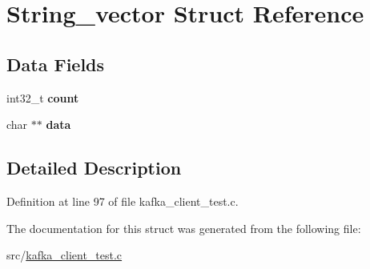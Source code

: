 \hypertarget{structString__vector}{\section{\-String\-\_\-vector \-Struct \-Reference}
\label{structString__vector}
}
\subsection*{\-Data \-Fields}
\begin{DoxyCompactItemize}
\item 
\hypertarget{structString__vector_aa3749113f2ee50991e0398e890ca05e0}{int32\-\_\-t {\bfseries count}}\label{structString__vector_aa3749113f2ee50991e0398e890ca05e0}

\item 
\hypertarget{structString__vector_ae65e2b4f4d044be7dfa6c6279df87c7e}{char $\ast$$\ast$ {\bfseries data}}\label{structString__vector_ae65e2b4f4d044be7dfa6c6279df87c7e}

\end{DoxyCompactItemize}


\subsection{\-Detailed \-Description}


\-Definition at line 97 of file kafka\-\_\-client\-\_\-test.\-c.



\-The documentation for this struct was generated from the following file\-:\begin{DoxyCompactItemize}
\item 
src/\hyperlink{kafka__client__test_8c}{kafka\-\_\-client\-\_\-test.\-c}\end{DoxyCompactItemize}
